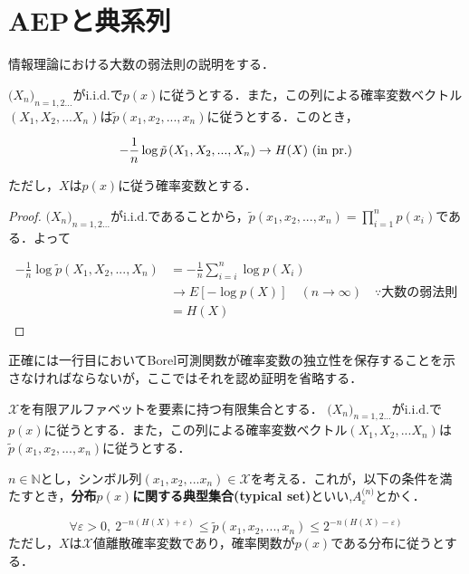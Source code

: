 \documentclass{classes/myclass}
\begin{document}
\section{AEPと典系列}

情報理論における大数の弱法則の説明をする．

\begin{thm}[AEP]
$\lparen X_n \rparen_{n = 1, 2...}$が$\mathrm{i.i.d.}$で$p(x)$に従うとする．また，この列による確率変数ベクトル$(X_1, X_2, ... X_n)$は$\tilde{p}(x_1, x_2, ..., x_n)$に従うとする．このとき，

\[
  -\frac{1}{n} \log \tilde{p}\left \lparen X_1, X_2, ..., X_n \right \rparen \rightarrow H(X) \ (\mathrm{in \ pr.})
\]

ただし，$X$は$p(x)$に従う確率変数とする．
\end{thm}

\begin{proof}
$\lparen X_n \rparen_{n = 1, 2...}$が$\mathrm{i.i.d.}$であることから，$\tilde{p}(x_1, x_2, ..., x_n) = \prod_{i = 1}^{n}p(x_i)$である．よって

\begin{align*}
  -\frac{1}{n} \log \tilde{p}(X_1, X_2, ..., X_n) &= -\frac{1}{n} \sum_{i = i}^{n} \log p(X_i) \label{form-num:check-identicality}\\
  &\rightarrow E[-\log p(X)] \quad (n \to \infty) \quad \because \text{大数の弱法則} \\
  &= H(X)
\end{align*}
\end{proof}

正確には一行目においてBorel可測関数が確率変数の独立性を保存することを示さなければならないが，ここではそれを認め証明を省略する．

\begin{dfn}[典系列]
$\mathcal{X}$を有限アルファベットを要素に持つ有限集合とする．
$\lparen X_n \rparen_{n = 1, 2...}$が$\mathrm{i.i.d.}$で$p(x)$に従うとする．また，この列による確率変数ベクトル$(X_1, X_2, ... X_n)$は$\tilde{p}(x_1, x_2, ..., x_n)$に従うとする．

$n \in \mathbb{N}$とし，シンボル列$(x_1, x_2,... x_n) \in \mathcal{X}$を考える．これが，以下の条件を満たすとき，\textbf{分布$p(x)$に関する典型集合(typical set)}といい,$A_{\varepsilon}^{\lparen n \rparen}$とかく．

\[
  \forall \varepsilon > 0, \  2^{-n(H(X) + \varepsilon)} \leq \tilde{p}(x_1, x_2, ..., x_n) \leq  2^{-n(H(X) - \varepsilon)}
\]
ただし，$X$は$\mathcal{X}$値離散確率変数であり，確率関数が$p(x)$である分布に従うとする．
\end{dfn}
\end{document}
